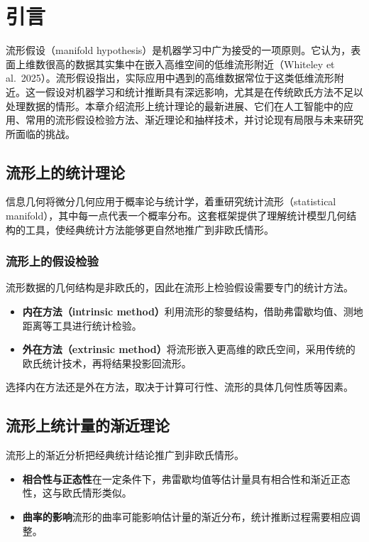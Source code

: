 \section{引言}

流形假设（manifold hypothesis）是机器学习中广为接受的一项原则。它认为，表面上维数很高的数据其实集中在嵌入高维空间的低维流形附近（Whiteley et al.\ 2025）。流形假设指出，实际应用中遇到的高维数据常位于这类低维流形附近。这一假设对机器学习和统计推断具有深远影响，尤其是在传统欧氏方法不足以处理数据的情形。本章介绍流形上统计理论的最新进展、它们在人工智能中的应用、常用的流形假设检验方法、渐近理论和抽样技术，并讨论现有局限与未来研究所面临的挑战。

\subsection{流形上的统计理论}

信息几何将微分几何应用于概率论与统计学，着重研究统计流形（statistical manifold），其中每一点代表一个概率分布。这套框架提供了理解统计模型几何结构的工具，使经典统计方法能够更自然地推广到非欧氏情形。

\subsubsection{流形上的假设检验}

流形数据的几何结构是非欧氏的，因此在流形上检验假设需要专门的统计方法。
\begin{itemize}
  \item \textbf{内在方法（intrinsic method）}利用流形的黎曼结构，借助弗雷歇均值、测地距离等工具进行统计检验。
  \item \textbf{外在方法（extrinsic method）}将流形嵌入更高维的欧氏空间，采用传统的欧氏统计技术，再将结果投影回流形。
\end{itemize}
选择内在方法还是外在方法，取决于计算可行性、流形的具体几何性质等因素。

\subsection{流形上统计量的渐近理论}

流形上的渐近分析把经典统计结论推广到非欧氏情形。
\begin{itemize}
  \item \textbf{相合性与正态性}在一定条件下，弗雷歇均值等估计量具有相合性和渐近正态性，这与欧氏情形类似。
  \item \textbf{曲率的影响}流形的曲率可能影响估计量的渐近分布，统计推断过程需要相应调整。
\end{itemize}

